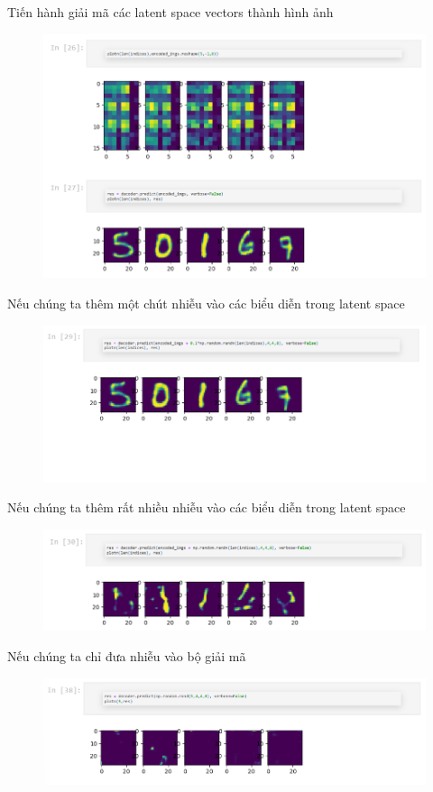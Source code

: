 \documentclass{book}
\begin{document}
Tiến hành giải mã các latent space vectors thành hình ảnh
\begin{figure}[H]
	\centering
	\includegraphics[width=0.75\linewidth]{images/au10.png}
\end{figure}

Nếu chúng ta thêm một chút nhiễu vào các biểu diễn trong latent space

\begin{figure}[H]
	\centering
	\includegraphics[width=0.75\linewidth]{images/au11.png}
\end{figure}

Nếu chúng ta thêm rất nhiều nhiễu vào các biểu diễn trong latent space

\begin{figure}[H]
	\centering
	\includegraphics[width=0.75\linewidth]{images/au12.png}
\end{figure}

Nếu chúng ta chỉ đưa nhiễu vào bộ giải mã

\begin{figure}[H]
	\centering
	\includegraphics[width=0.75\linewidth]{images/au13.png}
\end{figure}
\end{document}
